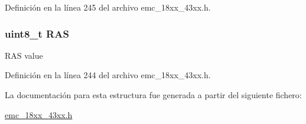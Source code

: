 Definición en la línea 245 del archivo emc\+\_\+18xx\+\_\+43xx.\+h.

\subsubsection[{\texorpdfstring{R\+AS}{RAS}}]{\setlength{\rightskip}{0pt plus 5cm}uint8\+\_\+t R\+AS}\hypertarget{struct_i_p___e_m_c___d_y_n___d_e_v_i_c_e___c_o_n_f_i_g___t_a72f5ca1c6016aa932675504a46235f6e}{}\label{struct_i_p___e_m_c___d_y_n___d_e_v_i_c_e___c_o_n_f_i_g___t_a72f5ca1c6016aa932675504a46235f6e}
R\+AS value 

Definición en la línea 244 del archivo emc\+\_\+18xx\+\_\+43xx.\+h.



La documentación para esta estructura fue generada a partir del siguiente fichero\+:\begin{DoxyCompactItemize}
\item 
\hyperlink{emc__18xx__43xx_8h}{emc\+\_\+18xx\+\_\+43xx.\+h}\end{DoxyCompactItemize}
